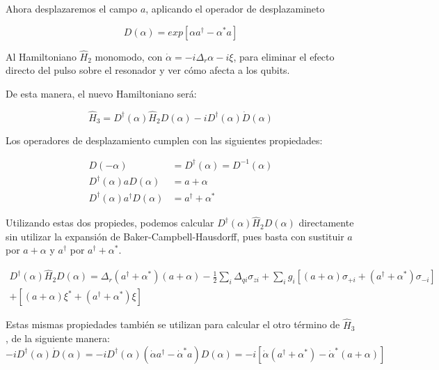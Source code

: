Ahora desplazaremos el campo $a$, aplicando el operador de desplazamineto

\begin{equation}
    D(\alpha) = exp[\alpha a^\dagger - \alpha^* a]
\end{equation}

Al Hamiltoniano $\hat{H}_2$ monomodo, con $\dot{\alpha} = -i \Delta_r \alpha -i \xi$, para eliminar el efecto directo del pulso sobre el resonador y ver cómo afecta a los qubits.

De esta manera, el nuevo Hamiltoniano será:

\begin{equation}
    \hat{H}_3 = D^\dagger (\alpha) \hat{H}_2 D(\alpha) -i D^\dagger(\alpha) \dot{D}(\alpha)
\end{equation}

Los operadores de desplazamiento cumplen con las siguientes propiedades:

\begin{align}
    D(-\alpha) &= D^\dagger(\alpha) = D^{-1}(\alpha) \\
    D^\dagger(\alpha) a D(\alpha) &= a + \alpha \\
    D^\dagger(\alpha) a^\dagger D(\alpha) &= a^\dagger + \alpha^*
\end{align}

\color{red}
Utilizando estas dos propiedes, podemos calcular $D^\dagger(\alpha) \hat{H}_2 D(\alpha)$ directamente sin utilizar la expansión de Baker-Campbell-Hausdorff, pues basta con sustituir $a$ por $a+\alpha$ y $a^\dagger$ por $a^\dagger+\alpha^*$.
\color{black}

\begin{multline}
  D^\dagger(\alpha) \hat{H}_2 D(\alpha) = \Delta_r (a^\dagger + \alpha^*) (a + \alpha) - \frac{1}{2} \sum\limits_i \Delta_{qi} \sigma_{zi} + \sum\limits_i g_i [(a+\alpha) \sigma_{+ i} + (a^\dagger+\alpha^*) \sigma_{- i}] \\
  + [(a+\alpha)\xi^*+(a^\dagger+\alpha^*)\xi]
\end{multline}

Estas mismas propiedades también se utilizan para calcular el otro término de $\hat{H}_3$, de la siguiente manera:
\begin{equation}
    -i D^\dagger(\alpha) \dot{D}(\alpha) = -i D^\dagger(\alpha) (\dot{\alpha} a^\dagger - \dot{\alpha}^* a) D(\alpha) = -i[\dot{\alpha} (a^\dagger + \alpha^*) - \dot{\alpha}^* (a + \alpha)]
\end{equation}

